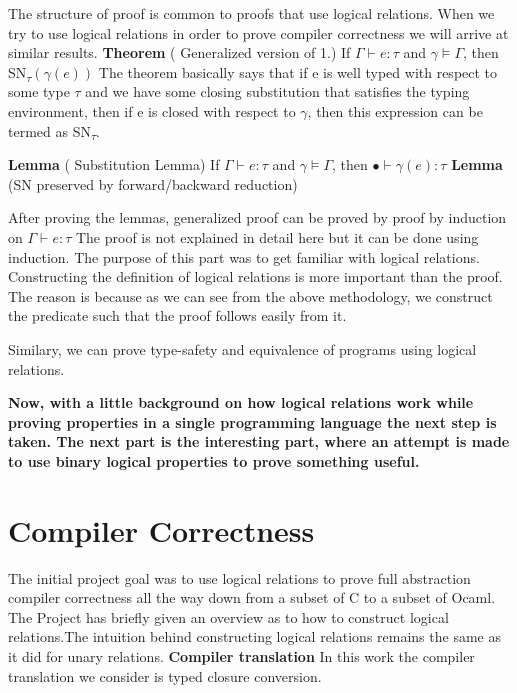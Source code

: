 \documentclass[10pt]{article}
\begin{document}
The structure of proof is common to proofs that use logical relations. When we try to use logical relations in order to prove compiler correctness we will arrive at similar results. 
\vskip 0.2in
\textbf{Theorem} ( Generalized version of 1.) If $\Gamma \vdash e : \tau $ and $\gamma \models \Gamma $, then SN\textsubscript{$\tau$}$ ( \gamma (e))$
\vskip 0.1in
The theorem basically says that if e is well typed with respect to some type $\tau$ and we have some closing substitution that satisfies the typing environment, then if e is closed with respect to $\gamma$, then this expression can be termed as SN\textsubscript{$\tau$}.

\vskip 0.2in
\textbf{Lemma} ( Substitution Lemma) If $\Gamma \vdash e : \tau $ and $\gamma \models \Gamma $, then $ \bullet \vdash \gamma (e) : \tau $
 \vskip 0.1in 
 \textbf{Lemma} (SN preserved by forward/backward reduction) 

  \vskip 0.2in 
  
After proving the lemmas, generalized proof can be proved by proof by induction on $\Gamma \vdash e : \tau $
  \vskip 0.1in
  The proof is not explained in detail here but it can be done using induction. The purpose of this part was to get familiar with logical relations. Constructing the definition of logical relations is more important than the proof. The reason is because as we can see from the above methodology, we construct the predicate such that the proof follows easily from it. 
  
  
\vskip 0.1in
Similary, we can prove type-safety and equivalence of programs using logical relations.   
\vskip 0.2in

\textbf{Now, with a little background on how logical relations work while proving properties in a single programming language the next step is taken. The next part is the interesting part, where an attempt is made to use binary logical properties to prove something useful.}

\newpage
\section{Compiler Correctness }
The initial project goal was to use logical relations to prove full abstraction compiler correctness all the way down from a subset of C to a subset  of Ocaml. The Project has briefly given an overview as to how to construct logical relations.The intuition behind constructing logical relations remains the same as it did for unary relations.
\vskip 0.2in
\textbf{Compiler translation} In this work the compiler translation we consider is typed closure conversion.
\end{document}
